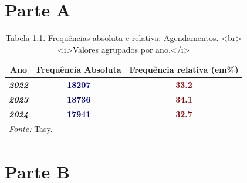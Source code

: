 \documentclass[
  letterpaper,
  DIV=11,
  numbers=noendperiod]{scrreprt}
\begin{document}

\section{Parte A}

\begin{table}
\centering
\caption{Tabela 1.1. Frequências absoluta e relativa: Agendamentos. <br><i>Valores agrupados por ano.</i>}
\centering
\begin{tabular}[t]{>{}c|>{}c|>{}c}
\hline
Ano & Frequência Absoluta & Frequência relativa (em\%)\\
\hline
\textcolor{black}{\em{\textbf{2022}}} & \textcolor{darkblue}{\textbf{18207}} & \textcolor{darkred}{\textbf{33.2}}\\
\hline
\textcolor{black}{\em{\textbf{2023}}} & \textcolor{darkblue}{\textbf{18736}} & \textcolor{darkred}{\textbf{34.1}}\\
\hline
\textcolor{black}{\em{\textbf{2024}}} & \textcolor{darkblue}{\textbf{17941}} & \textcolor{darkred}{\textbf{32.7}}\\
\hline
\multicolumn{3}{l}{\rule{0pt}{1em}\textit{Fonte: } Tasy.}\\
\end{tabular}
\end{table}

\section{Parte B}
\end{document}
